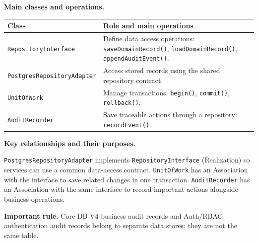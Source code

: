 
\noindent\textbf{Main classes and operations.}\par\smallskip
\begingroup\small
\begin{tabularx}{\textwidth}{|L{0.37\textwidth}|Y|}
\hline
\textbf{Class} & \textbf{Role and main operations} \\ \hline
\texttt{RepositoryInterface} & Define data access operations: \texttt{saveDomainRecord()}, \texttt{loadDomainRecord()}, \texttt{appendAuditEvent()}. \\ \hline
\texttt{PostgresRepositoryAdapter} & Access stored records using the shared repository contract. \\ \hline
\texttt{UnitOfWork} & Manage transactions: \texttt{begin()}, \texttt{commit()}, \texttt{rollback()}. \\ \hline
\texttt{AuditRecorder} & Save traceable actions through a repository: \texttt{recordEvent()}. \\ \hline
\end{tabularx}\par
\endgroup

\noindent\textbf{Key relationships and their purposes.}\par\smallskip
\texttt{PostgresRepositoryAdapter} implements
\texttt{RepositoryInterface} (Realization) so services can use a common
data-access contract. \texttt{UnitOfWork} has an Association with the
interface to save related changes in one transaction.
\texttt{AuditRecorder} has an Association with the same interface to
record important actions alongside business operations.

\noindent\textbf{Important rule.} Core DB V4 business audit records and Auth/RBAC
authentication audit records belong to separate data stores; they are not
the same table.


\setcounter{secnumdepth}{3}
